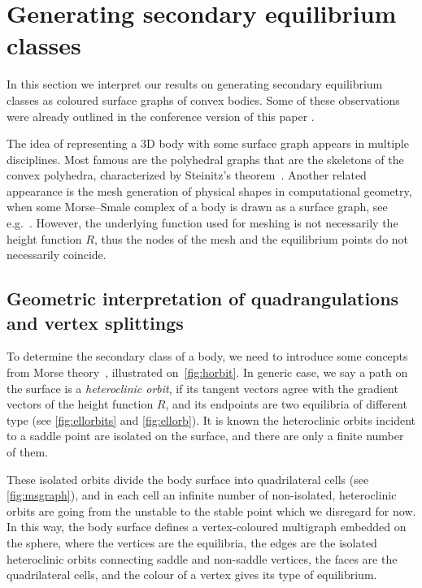 \documentclass[]{article}
\begin{document}
\section{Generating secondary equilibrium classes}
\label{sec:geometry}

In this section we interpret our results on generating secondary equilibrium classes as coloured surface graphs of convex bodies.
Some of these observations were already outlined in the conference version of this paper \cite{Kapolnai2011}.

The idea of representing a 3D body with some surface graph appears in multiple disciplines.
Most famous are the polyhedral graphs that are the skeletons of the convex polyhedra, characterized by Steinitz's theorem~\cite{Mohar2001}.
Another related appearance is the mesh generation of physical shapes in computational geometry, when some Morse--Smale complex of a body is drawn as a surface graph, see e.g.\  \cite{Dong2006}.
However, the underlying function used for meshing is not necessarily the height function $R$, thus the nodes of the mesh and the equilibrium points do not necessarily coincide.


\subsection{Geometric interpretation of quadrangulations and vertex splittings}

To determine the secondary class of a body, we need to introduce some concepts from Morse theory~\cite{Arnold1978,Edelsbrunner2001}, illustrated on~\autoref{fig:horbit}.
In generic case, we say a path on the surface is a \emph{heteroclinic orbit}, if its tangent vectors agree with the gradient vectors of the height function $R$, and its endpoints are two equilibria of different type (see \autoref{fig:ellorbits} and \ref{fig:ellorb}).
It is known the heteroclinic orbits incident to a saddle point are isolated on the surface, and there are only a finite number of them.

These isolated orbits divide the body surface into quadrilateral cells (see \autoref{fig:msgraph}), and in each cell an infinite number of non-isolated, heteroclinic orbits are going from the unstable to the stable point which we disregard for now.
In this way, the body surface defines a vertex-coloured multigraph embedded on the sphere, where the vertices are the equilibria, the edges are the isolated heteroclinic orbits connecting saddle and non-saddle vertices, the faces are the quadrilateral cells, and the colour of a vertex gives its type of equilibrium.
\end{document}

